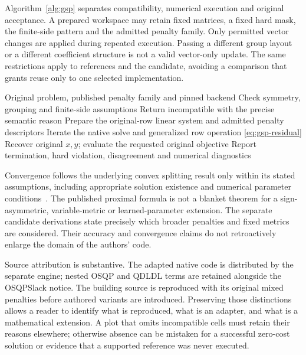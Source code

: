 Algorithm~\ref{alg:gsp} separates compatibility, numerical execution and original
acceptance. A prepared workspace may retain fixed matrices, a fixed hard mask,
the finite-side pattern and the admitted penalty family. Only permitted vector
changes are applied during repeated execution. Passing a different group layout
or a different coefficient structure is not a valid vector-only update. The
same restrictions apply to references and the candidate, avoiding a comparison
that grants reuse only to one selected implementation.

\begin{algorithm}[htbp]
\caption{Execute the published generalized projection only on supported penalty semantics, retaining the original row system and independent objective and feasibility recovery.}\label{alg:gsp}
\begin{algorithmic}[1]
\Require Original problem, published penalty family and pinned backend
\State Check symmetry, grouping and finite-side assumptions
\State Return incompatible with the precise semantic reason
\EndIf
\State Prepare the original-row linear system and admitted penalty descriptors
\State Iterate the native solve and generalized row operation \eqref{eq:gsp-residual}
\State Recover original $x,y$; evaluate the requested original objective
\State Report termination, hard violation, disagreement and numerical diagnostics
\end{algorithmic}
\end{algorithm}

Convergence follows the underlying convex splitting result only within its
stated assumptions, including appropriate solution existence and numerical
parameter conditions~\cite{admm,eckstein}. The published proximal formula is not
a blanket theorem for a sign-asymmetric, variable-metric or learned-parameter
extension. The separate candidate derivations state precisely which broader
penalties and fixed metrics are considered. Their accuracy and convergence
claims do not retroactively enlarge the domain of the authors' code.

Source attribution is substantive. The adapted native code is distributed by
the separate engine; nested OSQP and QDLDL terms are retained alongside the
OSQPSlack notice. The building source is reproduced with its original mixed
penalties before authored variants are introduced. Preserving those distinctions
allows a reader to identify what is reproduced, what is an adapter, and what is
a mathematical extension. A plot that omits incompatible cells must retain their
reasons elsewhere; otherwise absence can be mistaken for a successful zero-cost
solution or evidence that a supported reference was never executed.

